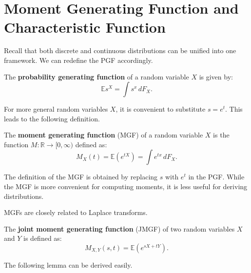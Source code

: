 \documentclass{huhtakm-template-book-v2}
\newcommand{\expect}{\mathbb{E}}
\begin{document}
\section{Moment Generating Function and Characteristic Function}
    Recall that both discrete and continuous distributions can be unified into one framework. We can redefine the PGF accordingly.
    \begin{defn}
        The \textbf{probability generating function} of a random variable $X$ is given by:
        \begin{equation*}
            \expect{s^{X}} = \int s^{x}\,dF_{X}.
        \end{equation*}
    \end{defn}
    For more general random variables $X$, it is convenient to substitute $s = e^{t}$. This leads to the following definition.
    \begin{defn}
        The \textbf{moment generating function} (MGF) of a random variable $X$ is the function $M:\mathbb{R} \to [0,\infty)$ defined as:
        \begin{equation*}
            M_{X}(t) = \expect(e^{tX}) = \int e^{tx}\,dF_{X}.
        \end{equation*}
    \end{defn}
    \begin{rem}
        The definition of the MGF is obtained by replacing $s$ with $e^{t}$ in the PGF. While the MGF is more convenient for computing moments, it is less useful for deriving distributions.
    \end{rem}
    \begin{rem}
        MGFs are closely related to Laplace transforms.
    \end{rem}
    \begin{defn}
        The \textbf{joint moment generating function} (JMGF) of two random variables $X$ and $Y$ is defined as:
        \begin{equation*}
            M_{X,Y}(s, t) = \expect(e^{sX+tY}).
        \end{equation*}
    \end{defn}
    The following lemma can be derived easily.
\end{document}
